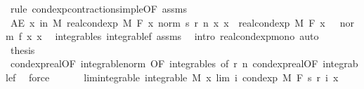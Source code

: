 \begin{isabellebody}
\ {\isacharparenleft}{\kern0pt}rule\ cond{\isacharunderscore}{\kern0pt}exp{\isacharunderscore}{\kern0pt}contraction{\isacharunderscore}{\kern0pt}simple{\isacharbrackleft}{\kern0pt}OF\ assms{\isacharparenleft}{\kern0pt}{}{\isacharcomma}{\kern0pt}{}{\isacharparenright}{\kern0pt}{\isacharbrackright}{\kern0pt}{\isacharparenright}{\kern0pt}\isanewline
\ \ \ \ \isamarkupfalse%
\ \isamarkupfalse%
\ {\isachardoublequoteopen}AE\ x\ in\ M{\isachardot}{\kern0pt}\ real{\isacharunderscore}{\kern0pt}cond{\isacharunderscore}{\kern0pt}exp\ M\ F\ {\isacharparenleft}{\kern0pt}{\isasymlambda}x{\isachardot}{\kern0pt}\ norm\ {\isacharparenleft}{\kern0pt}s\ {\isacharparenleft}{\kern0pt}r\ n{\isacharparenright}{\kern0pt}\ x{\isacharparenright}{\kern0pt}{\isacharparenright}{\kern0pt}\ x\ {\isasymle}\ real{\isacharunderscore}{\kern0pt}cond{\isacharunderscore}{\kern0pt}exp\ M\ F\ {\isacharparenleft}{\kern0pt}{\isasymlambda}x{\isachardot}{\kern0pt}\ {}\ {\isacharasterisk}{\kern0pt}\ norm\ {\isacharparenleft}{\kern0pt}f\ x{\isacharparenright}{\kern0pt}{\isacharparenright}{\kern0pt}\ x{\isachardoublequoteclose}\ \isamarkupfalse%
\ integrable{\isacharunderscore}{\kern0pt}s\ integrable{\isacharunderscore}{\kern0pt}{}f\ assms{\isacharparenleft}{\kern0pt}{}{\isacharparenright}{\kern0pt}\ \isamarkupfalse%
\ {\isacharparenleft}{\kern0pt}intro\ real{\isacharunderscore}{\kern0pt}cond{\isacharunderscore}{\kern0pt}exp{\isacharunderscore}{\kern0pt}mono{\isacharcomma}{\kern0pt}\ auto{\isacharparenright}{\kern0pt}\ \isanewline
\ \ \ \ \isamarkupfalse%
\ \isamarkupfalse%
\ {\isacharquery}{\kern0pt}thesis\ \isamarkupfalse%
\ cond{\isacharunderscore}{\kern0pt}exp{\isacharunderscore}{\kern0pt}real{\isacharbrackleft}{\kern0pt}OF\ integrable{\isacharunderscore}{\kern0pt}norm{\isacharcomma}{\kern0pt}\ OF\ integrable{\isacharunderscore}{\kern0pt}s{\isacharcomma}{\kern0pt}\ of\ {\isachardoublequoteopen}r\ n{\isachardoublequoteclose}{\isacharbrackright}{\kern0pt}\ cond{\isacharunderscore}{\kern0pt}exp{\isacharunderscore}{\kern0pt}real{\isacharbrackleft}{\kern0pt}OF\ integrable{\isacharunderscore}{\kern0pt}{}f{\isacharbrackright}{\kern0pt}\ \isamarkupfalse%
\ force\isanewline
\ \ \isamarkupfalse%
\isanewline
\ \ \isamarkupfalse%
\ lim{\isacharunderscore}{\kern0pt}integrable{\isacharcolon}{\kern0pt}\ {\isachardoublequoteopen}integrable\ M\ {\isacharparenleft}{\kern0pt}{\isasymlambda}x{\isachardot}{\kern0pt}\ lim\ {\isacharparenleft}{\kern0pt}{\isasymlambda}i{\isachardot}{\kern0pt}\ cond{\isacharunderscore}{\kern0pt}exp\ M\ F\ {\isacharparenleft}{\kern0pt}s\ {\isacharparenleft}{\kern0pt}r\ i{\isacharparenright}{\kern0pt}{\isacharparenright}{\kern0pt}\ x{\isacharparenright}{\kern0pt}{\isacharparenright}{\kern0pt}{\isachardoublequoteclose}\ \isamarkupfalse%

\end{isabellebody}
